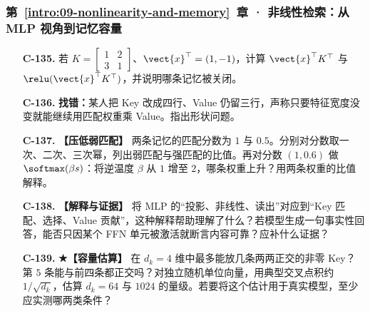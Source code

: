 \subsubsection*{第~\ref*{intro:09-nonlinearity-and-memory}~章 · 非线性检索：从 MLP 视角到记忆容量}
\begin{enumerate}[label={},leftmargin=4.8em,itemsep=4pt]
\item[\textbf{C-135.}] \leavevmode{}\label{exercise:C-135}\label{exercise:memory-relu-read}若 $K=\begin{bmatrix}1&2\\3&1\end{bmatrix}$、$\vect{x}^\top=(1,-1)$，计算 $\vect{x}^\top K^\top$ 与 $\relu(\vect{x}^\top K^\top)$，并说明哪条记忆被关闭。
\item[\textbf{C-136.}] \leavevmode{}\label{exercise:C-136}\label{exercise:memory-pairing-shape}\textbf{找错：}某人把 Key 改成四行、Value 仍留三行，声称只要特征宽度没变就能继续用匹配权重乘 Value。指出形状问题。
\item[\textbf{C-137.}] \leavevmode{}\label{exercise:C-137}\label{exercise:memory-selectivity}\textbf{【压低弱匹配】} 两条记忆的匹配分数为 $1$ 与 $0.5$。分别对分数取一次、二次、三次幂，列出弱匹配与强匹配的比值。再对分数 $(1,0.6)$ 做 $\softmax(\beta s)$：将逆温度 $\beta$ 从 $1$ 增至 $2$，哪条权重上升？用两条权重的比值解释。
\item[\textbf{C-138.}] \leavevmode{}\label{exercise:C-138}\label{exercise:memory-mlp-interpretation}\textbf{【解释与证据】} 将 MLP 的“投影、非线性、读出”对应到“Key 匹配、选择、Value 贡献”，这种解释帮助理解了什么？若模型生成一句事实性回答，能否只因某个 FFN 单元被激活就断言内容可靠？应补什么证据？
\item[\textbf{C-139.}] \leavevmode{}\label{exercise:C-139}\label{exercise:memory-random-capacity}\textbf{{\symboliconfont ★}【容量估算】} 在 $d_k=4$ 维中最多能放几条两两正交的非零 Key？第 $5$ 条能与前四条都正交吗？对独立随机单位向量，用典型交叉点积约 $1/\sqrt{d_k}$，估算 $d_k=64$ 与 $1024$ 的量级。若要将这个估计用于真实模型，至少应实测哪两类条件？
\end{enumerate}
